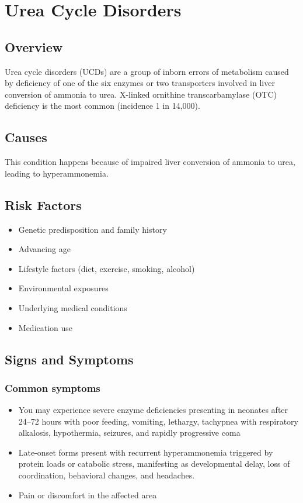 \chapter{Urea Cycle Disorders}
\label{sec:Urea Cycle Disorders}

\section{Overview}
Urea cycle disorders (UCDs) are a group of inborn errors of metabolism caused by deficiency of one of the six enzymes or two transporters involved in liver conversion of ammonia to urea. X-linked ornithine transcarbamylase (OTC) deficiency is the most common (incidence 1 in 14,000).
\section{Causes}
This condition happens because of impaired liver conversion of ammonia to urea, leading to hyperammonemia.     
\section{Risk Factors}

\begin{itemize}[noitemsep]
  \item Genetic predisposition and family history
  \item Advancing age
  \item Lifestyle factors (diet, exercise, smoking, alcohol)
  \item Environmental exposures
  \item Underlying medical conditions
  \item Medication use
\end{itemize}
\section{Signs and Symptoms}

\subsection{Common symptoms}
\begin{itemize}[noitemsep]
  \item You may experience severe enzyme deficiencies presenting in neonates after 24--72 hours with poor feeding, vomiting, lethargy, tachypnea with respiratory alkalosis, hypothermia, seizures, and rapidly progressive coma
  \item Late-onset forms present with recurrent hyperammonemia triggered by protein loads or catabolic stress, manifesting as developmental delay, loss of coordination, behavioral changes, and headaches.
  \item Pain or discomfort in the affected area
  \end{itemize}

